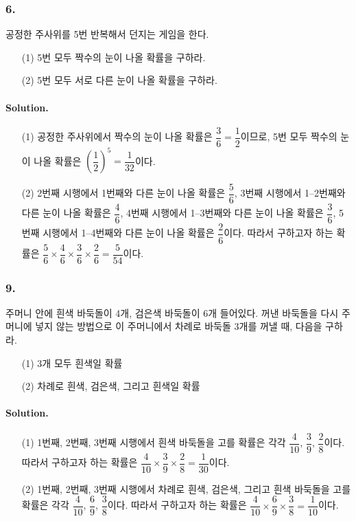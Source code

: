\subsubsection{6.} 공정한 주사위를 5번 반복해서 던지는 게임을 한다.
\begin{itemize}
	\item[(1)] 5번 모두 짝수의 눈이 나올 확률을 구하라.
	\item[(2)] 5번 모두 서로 다른 눈이 나올 확률을 구하라.
\end{itemize}

\paragraph{Solution.}
\begin{itemize}
	\item[(1)] 공정한 주사위에서 짝수의 눈이 나올 확률은 $\dfrac{3}{6} = \dfrac{1}{2}$이므로, 5번 모두 짝수의 눈이 나올 확률은 $\left(\dfrac{1}{2}\right)^5=\dfrac{1}{32}$이다.
	\item[(2)] 2번째 시행에서 1번째와 다른 눈이 나올 확률은 $\dfrac{5}{6}$, 3번째 시행에서 1--2번째와 다른 눈이 나올 확률은 $\dfrac{4}{6}$, 4번째 시행에서 1--3번째와 다른 눈이 나올 확률은 $\dfrac{3}{6}$, 5번째 시행에서 1--4번째와 다른 눈이 나올 확률은 $\dfrac{2}{6}$이다. 따라서 구하고자 하는 확률은 $\dfrac{5}{6}\times\dfrac{4}{6}\times\dfrac{3}{6}\times\dfrac{2}{6}=\dfrac{5}{54}$이다.
\end{itemize}

\subsubsection{9.} 주머니 안에 흰색 바둑돌이 4개, 검은색 바둑돌이 6개 들어있다. 꺼낸 바둑돌을 다시 주머니에 넣지 않는 방법으로 이 주머니에서 차례로 바둑돌 3개를 꺼낼 때, 다음을 구하라.
\begin{itemize}
	\item[(1)] 3개 모두 흰색일 확률
	\item[(2)] 차례로 흰색, 검은색, 그리고 흰색일 확률
\end{itemize}

\paragraph{Solution.}
\begin{itemize}
	\item[(1)] 1번째, 2번째, 3번째 시행에서 흰색 바둑돌을 고를 확률은 각각 $\dfrac{4}{10}$, $\dfrac{3}{9}$, $\dfrac{2}{8}$이다. 따라서 구하고자 하는 확률은 $\dfrac{4}{10}\times\dfrac{3}{9}\times\dfrac{2}{8}=\dfrac{1}{30}$이다.
	\item[(2)] 1번째, 2번째, 3번째 시행에서 차례로 흰색, 검은색, 그리고 흰색 바둑돌을 고를 확률은 각각 $\dfrac{4}{10}$, $\dfrac{6}{9}$, $\dfrac{3}{8}$이다. 따라서 구하고자 하는 확률은 $\dfrac{4}{10}\times\dfrac{6}{9}\times\dfrac{3}{8}=\dfrac{1}{10}$이다.
\end{itemize}

